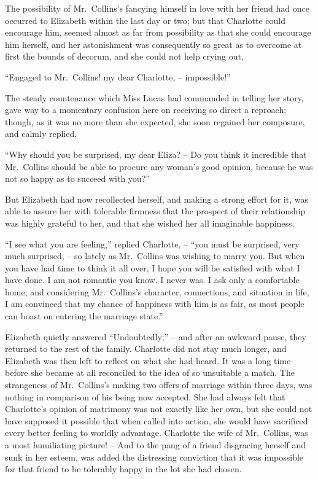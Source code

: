 The possibility of Mr.\ Collins’s fancying himself in love
with her friend had once occurred to Elizabeth within the
last day or two; but that Charlotte could encourage him,
seemed almost as far from possibility as that she could
encourage him herself, and her astonishment was consequently
so great as to overcome at first the bounds of
decorum, and she could not help crying out,

“Engaged to Mr.\ Collins! my dear Charlotte, --
impossible!”

The steady countenance which Miss Lucas had commanded
in telling her story, gave way to a momentary
confusion here on receiving so direct a reproach; though,
as it was no more than she expected, she soon regained her
composure, and calmly replied,

“Why should you be surprised, my dear Eliza? -- Do
you think it incredible that Mr.\ Collins should be able to
procure any woman’s good opinion, because he was not so
happy as to succeed with you?”

But Elizabeth had now recollected herself, and making a
strong effort for it, was able to assure her with tolerable
firmness that the prospect of their relationship was highly grateful
to her, and that she wished her all imaginable happiness.

“I see what you are feeling,” replied Charlotte, -- “you
must be surprised, very much surprised, -- so lately as
Mr.\ Collins was wishing to marry you. But when you
have had time to think it all over, I hope you will be
satisfied with what I have done. I am not romantic you
know. I never was. I ask only a comfortable home;
and considering Mr.\ Collins’s character, connections, and
situation in life, I am convinced that my chance of happiness
with him is as fair, as most people can boast on
entering the marriage state.”

Elizabeth quietly answered “Undoubtedly;” -- and
after an awkward pause, they returned to the rest of the
family. Charlotte did not stay much longer, and Elizabeth
was then left to reflect on what she had heard. It was
a long time before she became at all reconciled to the idea
of so unsuitable a match. The strangeness of Mr.\ Collins’s
making two offers of marriage within three days, was
nothing in comparison of his being now accepted. She
had always felt that Charlotte’s opinion of matrimony
was not exactly like her own, but she could not have
supposed it possible that when called into action, she
would have sacrificed every better feeling to worldly
advantage. Charlotte the wife of Mr.\ Collins, was a most
humiliating picture! -- And to the pang of a friend disgracing
herself and sunk in her esteem, was added the
distressing conviction that it was impossible for that
friend to be tolerably happy in the lot she had chosen.

